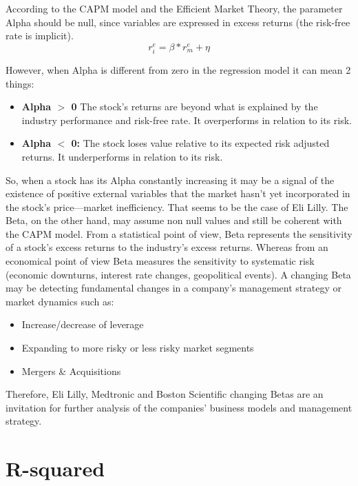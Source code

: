 According to the CAPM model and the Efficient Market Theory, the parameter Alpha should be null, since variables are expressed
in excess returns (the risk-free rate is implicit).
\begin{equation}
    r^{e}_{i} = \beta * r^{e}_{m} + \eta
\end{equation}\label{equation:CAPM}

However, when Alpha is different from zero in the regression model it can mean 2 things:
\begin{itemize}
    \item \textbf{Alpha $>$ 0} The stock's returns are beyond what is explained by the industry performance and risk-free rate. 
    It overperforms in relation to its risk.
    \item \textbf{Alpha $<$ 0:} The stock loses value relative to its expected risk adjusted returns. 
    It underperforms in relation to its risk.
\end{itemize}

So, when a stock has its Alpha constantly increasing it may be a signal of the existence of positive external variables that
the market hasn't yet incorporated in the stock's price—market inefficiency. That seems to be the case of Eli Lilly.
The Beta, on the other hand, may assume non null values and still be coherent with the CAPM model. 
From a statistical point of view, Beta represents the sensitivity of a stock's excess returns to the industry's excess returns.
Whereas from an economical point of view Beta measures the sensitivity to systematic risk (economic downturns, interest rate 
changes, geopolitical events).
A changing Beta may be detecting fundamental changes in a company's management strategy or market dynamics such as:
\begin{itemize}
    \item Increase/decrease of leverage
    \item Expanding to more risky or less risky market segments
    \item Mergers \& Acquisitions
\end{itemize}

Therefore, Eli Lilly, Medtronic and Boston Scientific changing Betas are an invitation for further analysis of the companies' 
business models and management strategy.

\section{R-squared}

